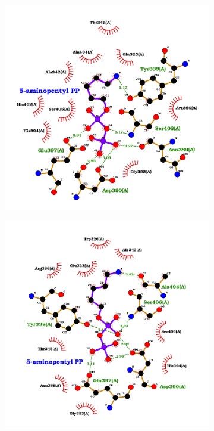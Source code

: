 \documentclass[12pt]{article}
\begin{document}
	\FloatBarrier
	\begin{figure}[h!]
		\centering
		\begin{subfigure}[h!]{0.35\textwidth}
			\hspace{2cm}
			\includegraphics[width=\textwidth]{../9/Dock/best.png}
			\caption{}
		\end{subfigure}
		\hfill
		\begin{subfigure}[h!]{0.35\textwidth}
			\hspace{-2cm}
			\includegraphics[width=\textwidth]{../9/Dock/best2.png}

\end{subfigure}
\end{figure}
\end{document}
